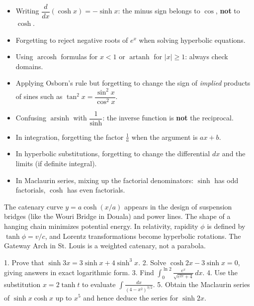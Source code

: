 \documentclass[11pt]{article}
\begin{document}
\begin{attention}
\begin{itemize}
\item Writing $\dfrac{d}{dx}(\cosh x)=-\sinh x$: the minus sign belongs to $\cos$, \textbf{not} to $\cosh$.
\item Forgetting to reject negative roots of $e^{x}$ when solving hyperbolic equations.
\item Using $\operatorname{arcosh}$ formulas for $x<1$ or $\operatorname{artanh}$ for $|x|\ge 1$: always check domains.
\item Applying Osborn's rule but forgetting to change the sign of \emph{implied} products of sines such as $\tan^{2}x=\dfrac{\sin^{2}x}{\cos^{2}x}$.
\item Confusing $\operatorname{arsinh}$ with $\dfrac{1}{\sinh}$: the inverse function is \textbf{not} the reciprocal.
\item In integration, forgetting the factor $\frac{1}{a}$ when the argument is $ax+b$.
\item In hyperbolic substitutions, forgetting to change the differential $dx$ and the limits (if definite integral).
\item In Maclaurin series, mixing up the factorial denominators: $\sinh$ has odd factorials, $\cosh$ has even factorials.
\end{itemize}
\end{attention}

\begin{savaistu}
The catenary curve $y=a\cosh(x/a)$ appears in the design of suspension bridges (like the Wouri Bridge in Douala) and power lines. The shape of a hanging chain minimizes potential energy. In relativity, rapidity $\phi$ is defined by $\tanh\phi = v/c$, and Lorentz transformations become hyperbolic rotations. The Gateway Arch in St. Louis is a weighted catenary, not a parabola.
\end{savaistu}

\begin{exercice}
1. Prove that $\sinh 3x = 3\sinh x + 4\sinh^{3}x$.
2. Solve $\cosh 2x - 3\sinh x = 0$, giving answers in exact logarithmic form.
3. Find $\displaystyle\int_{0}^{\ln 2}\frac{e^{x}}{\sqrt{e^{2x}+4}}\,dx$.
4. Use the substitution $x=2\tanh t$ to evaluate $\displaystyle\int\frac{dx}{(4-x^{2})^{3/2}}$.
5. Obtain the Maclaurin series of $\sinh x \cosh x$ up to $x^{5}$ and hence deduce the series for $\sinh 2x$.
\end{exercice}
\end{document}
